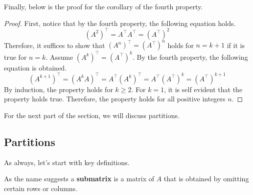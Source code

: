 \documentclass[../../main.tex]{subfiles}
\begin{document}
Finally, below is the proof for the corollary of the fourth property.

\begin{proof}
First, notice that by the fourth property, the following equation
holds.
\[
\left( A^2 \right)^\intercal
= A^\intercal A^\intercal
= \left( A^\intercal \right)^2
\]
Therefore, it suffices to show that $(A^n)^\intercal =
(A^\intercal)^n$ holds for $n = k + 1$ if it is true for $n = k$.
Assume $(A^k)^\intercal = (A^\intercal)^k$. By the fourth property,
the following equation is obtained.
\[
\left( A^{k+1} \right)^\intercal
= (A^k A)^\intercal
= A^\intercal (A^k)^\intercal
= A^\intercal (A^\intercal)^k
= (A^\intercal)^{k + 1}
\]
By induction, the property holds for $k \geq 2$. For $k = 1$,
it is self evident that the property holds true. Therefore, the
property holds for all positive integers $n$.
\end{proof}

For the next part of the section, we will discuss partitions.

\subsection{Partitions}

As always, let's start with key definitions.

\begin{definition}{}{}
As the name suggests a \textbf{submatrix} is a matrix of $A$ that
is obtained by omitting certain rows or columns.
\end{definition}
\end{document}
